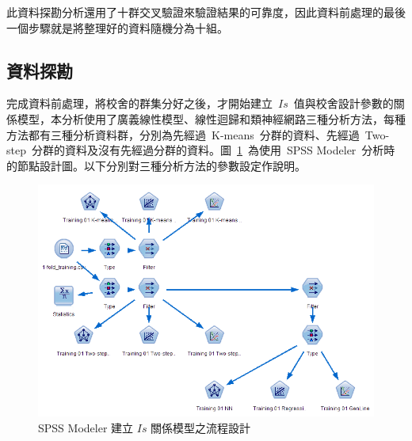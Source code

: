 此資料探勘分析還用了十群交叉驗證來驗證結果的可靠度，因此資料前處理的最後一個步驟就是將整理好的資料隨機分為十組。


\subsection{資料探勘}

完成資料前處理，將校舍的群集分好之後，才開始建立~$Is$~值與校舍設計參數的關係模型，本分析使用了廣義線性模型、線性迴歸和類神經網路三種分析方法，每種方法都有三種分析資料群，分別為先經過~K-means~分群的資料、先經過~Two-step~分群的資料及沒有先經過分群的資料。圖~\ref{fig:spss-mining}~為使用~SPSS Modeler~分析時的節點設計圖。以下分別對三種分析方法的參數設定作說明。

\begin{figure}[hbtp]
  \begin{center}
    \includegraphics[width=1.0\textwidth]{figures/spss-mining.png}
    \caption{SPSS Modeler 建立 $Is$ 關係模型之流程設計} 
    \label{fig:spss-mining}
  \end{center}
\end{figure}


